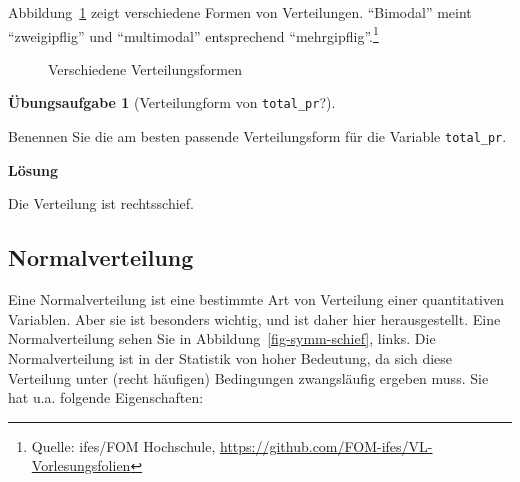 \documentclass[
  letterpaper,
]{scrbook}
\theoremstyle{definition}
\newtheorem{exercise}{Übungsaufgabe}[chapter]
\theoremstyle{definition}
\theoremstyle{definition}
\theoremstyle{remark}
\begin{document}
Abbildung~\ref{fig-plot-distribs} zeigt verschiedene Formen von
Verteilungen. \enquote{Bimodal} meint \enquote{zweigipflig} und
\enquote{multimodal} entsprechend \enquote{mehrgipflig}.\footnote{Quelle:
  ifes/FOM Hochschule,
  \url{https://github.com/FOM-ifes/VL-Vorlesungsfolien}}

\begin{figure}


\caption{\label{fig-plot-distribs}Verschiedene Verteilungsformen}

\end{figure}%

\begin{exercise}[Verteilungform von
\texttt{total\_pr}?]\protect\hypertarget{exr-verteilungsform-total-pr}{}\label{exr-verteilungsform-total-pr}

Benennen Sie die am besten passende Verteilungsform für die Variable
\texttt{total\_pr}.

\textbf{Lösung}

Die Verteilung ist rechtsschief.

\end{exercise}

\subsection{Normalverteilung}\label{normalverteilung}

Eine Normalverteilung ist eine bestimmte Art von Verteilung einer
quantitativen Variablen. Aber sie ist besonders wichtig, und ist daher
hier herausgestellt. Eine Normalverteilung sehen Sie in
Abbildung~\ref{fig-symm-schief}, links. Die Normalverteilung ist in der
Statistik von hoher Bedeutung, da sich diese Verteilung unter (recht
häufigen) Bedingungen zwangsläufig ergeben muss. Sie hat u.a. folgende
Eigenschaften:
\end{document}
